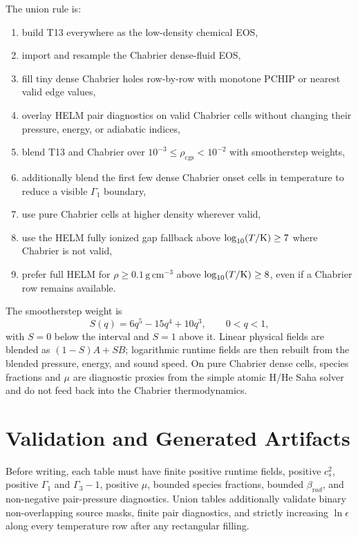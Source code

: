 \documentclass[11pt]{article}
\newcommand{\eps}{\epsilon}
\begin{document}
The union rule is:
\begin{enumerate}
  \item build T13 everywhere as the low-density chemical EOS,
  \item import and resample the Chabrier dense-fluid EOS,
  \item fill tiny dense Chabrier holes row-by-row with monotone PCHIP or
        nearest valid edge values,
  \item overlay HELM pair diagnostics on valid Chabrier cells without changing
        their pressure, energy, or adiabatic indices,
  \item blend T13 and Chabrier over
        $10^{-3}\le\rho_{\mathrm{cgs}}<10^{-2}$ with smootherstep weights,
  \item additionally blend the first few dense Chabrier onset cells in
        temperature to reduce a visible $\Gamma_1$ boundary,
  \item use pure Chabrier cells at higher density wherever valid,
  \item use the HELM fully ionized gap fallback above
        $\log_{10}(T/{\rm K})\ge 7$ where Chabrier is not valid,
  \item prefer full HELM for $\rho\ge0.1\,\mathrm{g\,cm^{-3}}$ above
        $\log_{10}(T/{\rm K})\ge 8$, even if a Chabrier row remains available.
\end{enumerate}
The smootherstep weight is
\begin{equation}
  S(q)=6q^5-15q^4+10q^3,\qquad 0<q<1,
\end{equation}
with $S=0$ below the interval and $S=1$ above it.  Linear physical fields are
blended as $(1-S)A+SB$; logarithmic runtime fields are then rebuilt from the
blended pressure, energy, and sound speed.  On pure Chabrier dense cells,
species fractions and $\mu$ are diagnostic proxies from the simple atomic H/He
Saha solver and do not feed back into the Chabrier thermodynamics.

\section{Validation and Generated Artifacts}

Before writing, each table must have finite positive runtime fields, positive
$c_s^2$, positive $\Gamma_1$ and $\Gamma_3-1$, positive $\mu$, bounded species
fractions, bounded $\beta_{\mathrm rad}$, and non-negative pair-pressure
diagnostics.  Union tables additionally validate binary non-overlapping source
masks, finite pair diagnostics, and strictly increasing $\ln\eps$ along every
temperature row after any rectangular filling.
\end{document}
